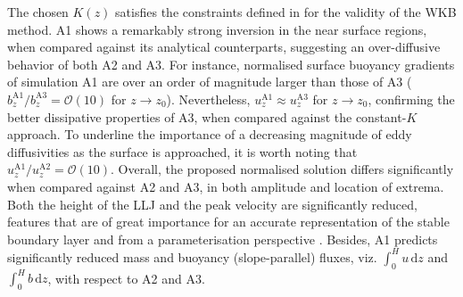 The chosen $K(z)$ satisfies the constraints defined in \citet{Grisogono2002} for the validity of the WKB method.
A1 shows a remarkably strong inversion in the near surface regions, when compared against its analytical counterparts, suggesting an over-diffusive behavior of both A2 and A3. 
For instance, normalised surface buoyancy gradients of simulation A1 are over an order of magnitude larger than those of A3 ($b_z^{\mathrm{A1}}/b_z^{\mathrm{A3}} = \mathcal{O}(10)$ for $z \rightarrow z_0$).
Nevertheless, $u_z^{\mathrm{A1}} \approx u_z^{\mathrm{A3}}$ for $z \rightarrow z_0$, confirming the better dissipative properties of A3, when compared against the constant-$K$ approach. 
To underline the importance of a decreasing magnitude of eddy diffusivities as the surface is approached, it is worth noting that $u_z^{\mathrm{A1}}/ u_z^{\mathrm{A2}} = \mathcal{O}(10)$. Overall, the proposed normalised solution differs significantly when compared against A2 and A3, in both amplitude and location of extrema. 
Both the height of the LLJ and the peak velocity are significantly reduced, features that are of great importance for an accurate representation of the stable boundary layer and from a parameterisation perspective \citep{Mahrt1998}.
Besides, A1 predicts significantly reduced mass and buoyancy (slope-parallel) fluxes, viz. $\int_0^{H}{u}{\, \mathrm{d}z}$ and $\int_0^{H}{b}{ \, \mathrm{d}z}$, with respect to A2 and A3.



